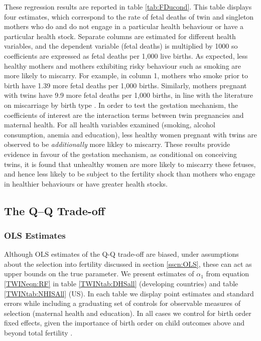 \documentclass[subeqn]{article}
\begin{document}
\begin{spacing}{1.4}
These regression results are reported in table \ref{tab:FDucond}.  This table
displays four estimates, which correspond to the rate of fetal deaths of twin
and singleton mothers who do and do not engage in a particular health behaviour
or have a particular health stock.  Separate columns are estimated for different
health variables, and the dependent variable (fetal deaths) is multiplied by 1000
so coefficients are expressed as fetal deaths per 1,000 live births. As expected,
less healthy mothers and mothers exhibiting risky behaviour such as smoking are
more likely to miscarry.  For example, in column 1, mothers who smoke prior to
birth have 1.39 more fetal deaths per 1,000 births.  Similarly, mothers pregnant
with twins have 9.9 more fetal deaths per 1,000 births, in line with the
literature on miscarriage by birth type \citep{Garciaetal2002}.  In order to
test the gestation mechanism, the coefficients of interest are the interaction
terms between twin pregnancies and maternal health.  For all health variables 
examined (smoking, alcohol consumption, anemia and education), less healthy women
pregnant with twins are observed to be \emph{additionally} more likley to
miscarry. These results provide evidence in favour of the gestation mechanism,
as conditional on conceiving twins, it is found that unhealthy women are more 
likely to miscarry these fetuses, and hence less likely to be subject to the
fertility shock than mothers who engage in healthier behaviours or have greater
health stocks.

\subsection{The Q--Q Trade-off} \label{TWINsscn:QQtwins}
\subsubsection{OLS Estimates} \label{TWINsscn:QQtwinsOLS}
Although OLS estimates of the Q-Q trade-off are biased, under assumptions about
the selection into fertility discussed in section \ref{sscn:OLS}, these can
act as upper bounds on the true parameter.  We present estimates of $\alpha_1$
from equation \ref{TWINeqn:RF} in table \ref{TWINtab:DHSall} (developing
countries) and table \ref{TWINtab:NHISAll} (US). In each table we display point
estimates and standard errors while including a graduating set of controls for
observable measures of selection (maternal health and education). In all cases
we control for birth order fixed effects, given the importance of birth order
on child outcomes above and beyond total fertility \citep{Blacketal2005}.


\end{spacing}
\end{document}

